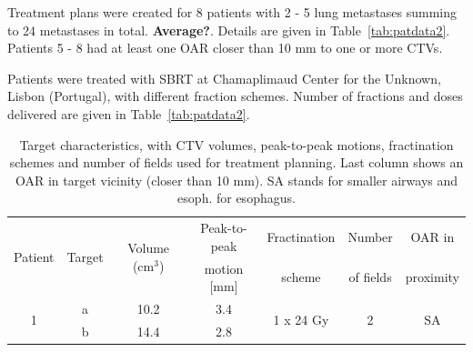 \documentclass[type=dr, dr=rernat, accentcolor=tud7b,colorbacktitle, bigchapter, openright, twoside, 12pt ]{tudthesis}
\begin{document}
Treatment plans were created for 8 patients with 2 - 5 lung metastases summing to 24 metastases in total. \textbf{Average?}. Details are given in Table~\ref{tab:patdata2}.
Patients 5 - 8 had at least one OAR closer than 10 mm to one or more CTVs. 

Patients were treated with SBRT at Chamaplimaud Center for the Unknown, Lisbon (Portugal), with different fraction schemes. Number of fractions and doses delivered are given in Table~\ref{tab:patdata2}. 

\begin{table}[H]
	\centering
	\caption{Target characteristics, with CTV volumes, peak-to-peak motions, fractination schemes and number of fields used for treatment planning. Last column 
	shows an OAR in target vicinity (closer than 10 mm). SA stands for smaller airways and esoph. for esophagus.}
	\begin{tabular}{c|c|c|c|c|c|c}
		\hline\hline
		\multirow{2}{*}{Patient} & \multirow{2}{*}{Target} & \multirow{2}{*}{Volume (cm$^3$)} & Peak-to-peak & Fractination & Number & OAR in \\
		 & & & motion [mm] & scheme & of fields & proximity \\
		\hline
		\multirow{2}{*}{1} & a & 10.2 & 3.4  & \multirow{2}{*}{1 x 24 Gy} & \multirow{2}{*}{2} & \multirow{2}{*}{SA} \\
		 & b & 14.4 & 2.8 &  &  &  \\


\end{tabular}
\end{table}
\end{document}
